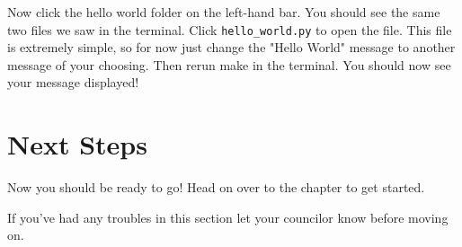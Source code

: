     Now click the hello world folder on the left-hand bar.
    You should see the same two files we saw in the terminal.
    Click \texttt{hello\_world.py} to open the file.
    This file is extremely simple, so for now just change the "Hello World" message to another message of your choosing.
    Then rerun make in the terminal.
    You should now see your message displayed!

  \section{Next Steps}
  \label{sec:next_steps}

    Now you should be ready to go!
    Head on over to the  chapter to get started.

    If you've had any troubles in this section let your councilor know before moving on.
